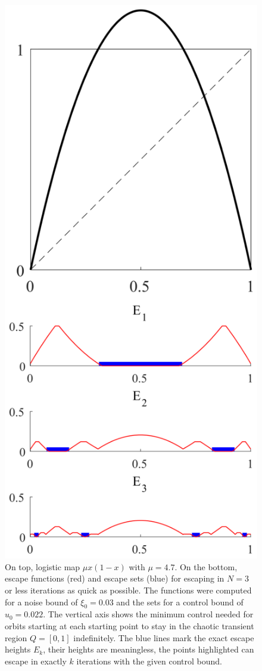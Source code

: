 \begin{figure}
    \centering
    \includegraphics[width=0.4\textheight]{Images/P1/EscapeSetsExact.eps}
    \caption{On top, logistic map $\mu x(1-x)$ with $\mu = 4.7$. On the bottom, escape functions (red) and escape sets (blue) for escaping in $N=3$ or less iterations as quick as possible. The functions were computed for a noise bound of $\xi_0 = 0.03$ and the sets for a control bound of $u_0 = 0.022$. The vertical axis shows the minimum control needed for orbits starting at each starting point to stay in the chaotic transient region $Q = [0,1]$ indefinitely. The blue lines mark the exact escape heights $E_k$, their heights are meaningless, the points highlighted can escape in exactly $k$ iterations with the given control bound. }
    \label{fig:EscapeSetsExact}
\end{figure}




